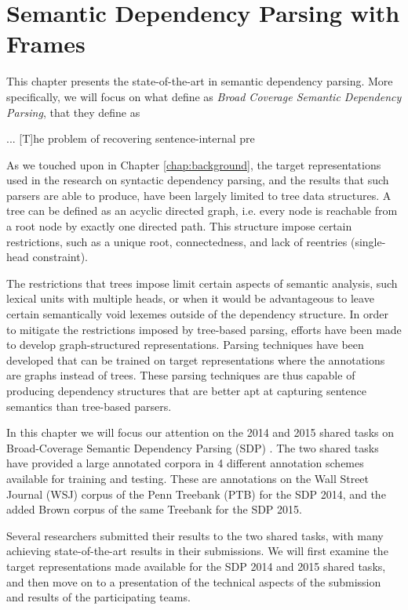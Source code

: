 \chapter{Semantic Dependency Parsing with Frames}
\label{chap:semantic}

This chapter presents the state-of-the-art in semantic dependency parsing. More specifically, we will focus on what  define as \textit{Broad Coverage Semantic Dependency Parsing}, that they define as

\begin{displayquote}
... [T]he problem of recovering sentence-internal pre
\end{displayquote}

As we touched upon in Chapter \ref{chap:background}, the target representations used in the research on syntactic dependency parsing, and the results that such parsers are able to produce, have been largely limited to tree data structures. A tree can be defined as an acyclic directed graph, i.e. every node is reachable from a root node by exactly one directed path. This structure impose certain restrictions, such as a unique root, connectedness, and lack of reentries (single-head constraint). 

The restrictions that trees impose limit certain aspects of semantic analysis, such lexical units with multiple heads, or when it would be advantageous to leave certain semantically void lexemes outside of the dependency structure. In order to mitigate the restrictions imposed by tree-based parsing, efforts have been made to develop graph-structured representations. Parsing techniques have been developed that can be trained on target representations where the annotations are graphs instead of trees. These parsing techniques are thus capable of producing dependency structures that are better apt at capturing sentence semantics than tree-based parsers.

In this chapter we will focus our attention on the 2014 and 2015 shared tasks on Broad-Coverage Semantic Dependency Parsing (SDP) \cite{Oepen:14, Oepen:15}. The two shared tasks have provided a large annotated corpora in 4 different annotation schemes available for training and testing. These are annotations on the Wall Street Journal (WSJ) corpus of the Penn Treebank (PTB) \cite{Mar:San:Mar:93} for the SDP 2014, and the added Brown corpus of the same Treebank for the SDP 2015.

Several researchers submitted their results to the two shared tasks, with many achieving state-of-the-art results in their submissions. We will first examine the target representations made available for the SDP 2014 and 2015 shared tasks, and then move on to a presentation of the technical aspects of the submission and results of the participating teams.


